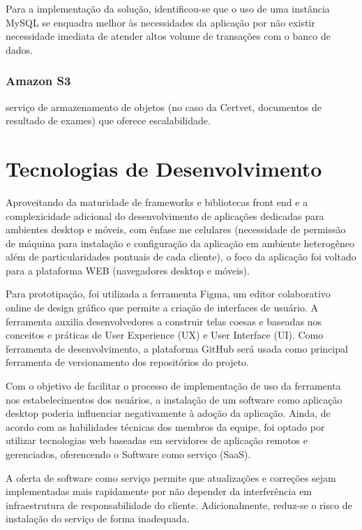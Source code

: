 \documentclass[
    12pt,               %
    openright,          %
    oneside,
    a4paper,            %
    BIBLATEX,           %
    TODO,               %
    english,            %
    brazil              %
    ]{ifsp-spo-inf-ctds}
\begin{document}
            Para a implementação da solução, identificou-se que o uso de uma instância MySQL se enquadra melhor às necessidades da aplicação por não existir necessidade imediata de atender altos volume de transações com o banco de dados.
            
        \subsubsection{Amazon S3}
        
            serviço de armazenamento de objetos (no caso da Certvet, documentos de resultado de exames) que oferece escalabilidade. 

    \section{Tecnologias de Desenvolvimento}
    
        Aproveitando da maturidade de frameworks e bibliotecas front end e a complexicidade adicional do desenvolvimento de aplicações dedicadas para ambientes desktop e móveis, com ênfase me celulares (necessidade de permissão de máquina para instalação e configuração da aplicação em ambiente heterogêneo além de particularidades pontuais de cada cliente), o foco da aplicação foi voltado para a plataforma WEB (navegadores desktop e móveis).
        
        Para prototipação, foi utilizada a ferramenta Figma, um editor colaborativo online de design gráfico que permite a criação de interfaces de usuário. A ferramenta auxilia desenvolvedores a construir telas coesas e baseadas nos conceitos e práticas de User Experience (UX) e User Interface (UI). Como ferramenta de desenvolvimento, a plataforma GitHub será usada como principal ferramenta de versionamento dos  repositórios do projeto.
        
        Com o objetivo de facilitar o processo de implementação de uso da ferramenta nos estabelecimentos dos usuários, a instalação de um software como aplicação desktop poderia influenciar negativamente à adoção da aplicação. Ainda, de acordo com as habilidades técnicas dos membros da equipe, foi optado por utilizar tecnologias web baseadas em servidores de aplicação remotos e gerenciados, oferencendo o Software como serviço (SaaS).
        
        A oferta de software como serviço permite que atualizações e correções sejam implementadas mais rapidamente por não depender da interferência em infraestrutura de responsabilidade do cliente. Adicionalmente, reduz-se o risco de instalação do serviço de forma inadequada.
\end{document}
